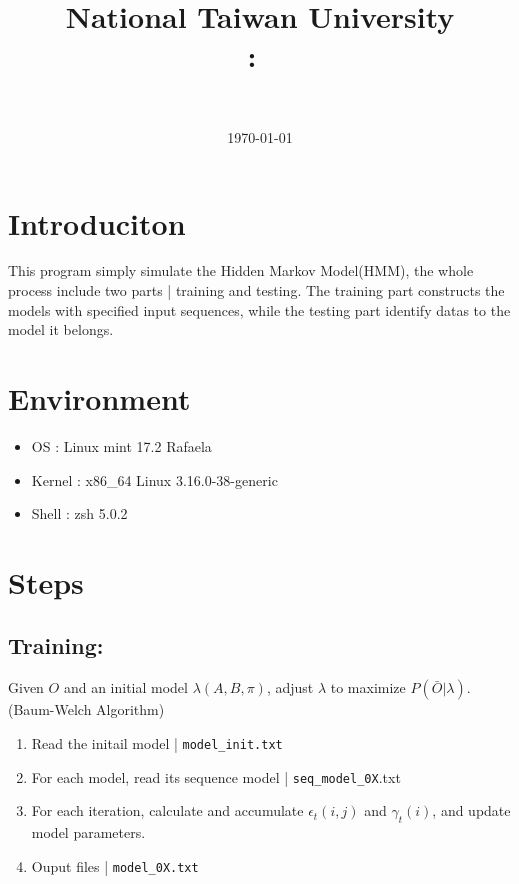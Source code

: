 \documentclass{article}
\title{
{National Taiwan University}\\    
    \textmd{\textbf{\Class:\ \Title}}
}
\author{
	\Department \ \AuthorID \\
	\textbf{\AuthorName}
}
\date{
	\today \\
	\horline{1pt}
}
\newcommand\n{\mbox{\qquad}}
\begin{document}
\maketitle
\section{Introduciton}
\n This program simply simulate the Hidden Markov Model(HMM), the whole process include 
two parts | training and testing. The training part constructs the models with specified
 input sequences, while the testing part identify datas to the model it belongs.
 
\section{Environment}
\begin{itemize}
	\item OS : Linux mint 17.2 Rafaela
	\item Kernel : x86\_64 Linux 3.16.0-38-generic
	\item Shell : zsh 5.0.2
\end{itemize}

\section{Steps}

\subsection{Training:}
\n Given $O$ and an initial model $\lambda (A,B,\pi)$, adjust $\lambda$ to maximize $P(\bar{O} | \lambda)$. (Baum-Welch Algorithm)
\begin{enumerate}
	\item Read the initail model | \texttt{model\_init.txt}
	\item For each model, read its sequence model | \texttt{seq\_model\_0X}.txt
	\item For each iteration, calculate and accumulate $\epsilon_t(i,j)$ and $\gamma_t(i)$, and update model parameters.
	\item Ouput files | \texttt{model\_0X.txt} 
\end{enumerate} 
\end{document}
